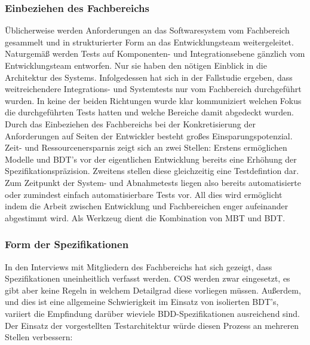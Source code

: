 \subsubsection{Einbeziehen des Fachbereichs}
Üblicherweise werden Anforderungen an das Softwaresystem vom Fachbereich gesammelt und in strukturierter Form an das Entwicklungsteam weitergeleitet. Naturgemäß werden Tests auf Komponenten- und Integrationsebene gänzlich vom Entwicklungsteam entworfen. Nur sie haben den nötigen Einblick in die Architektur des Systems. Infolgedessen hat sich in der Fallstudie ergeben, dass weitreichendere Integrations- und Systemtests nur vom Fachbereich durchgeführt wurden. In keine der beiden Richtungen wurde klar kommuniziert welchen Fokus die durchgeführten Tests hatten und welche Bereiche damit abgedeckt wurden. Durch das Einbeziehen des Fachbereichs bei der Konkretisierung der Anforderungen auf Seiten der Entwickler besteht großes Einsparungspotenzial. Zeit- und Ressourcenersparnis zeigt sich an zwei Stellen: Erstens ermöglichen Modelle und \Gls{BDT}'s vor der eigentlichen Entwicklung bereits eine Erhöhung der Spezifikationspräzision. Zweitens stellen diese gleichzeitig eine Testdefintion dar. Zum Zeitpunkt der System- und Abnahmetests liegen also bereits automatisierte oder zumindest einfach automatisierbare Tests vor. All dies wird ermöglicht indem die Arbeit zwischen Entwicklung und Fachbereichen enger aufeinander abgestimmt wird. Als Werkzeug dient die Kombination von \Gls{MBT} und \Gls{BDT}.

\subsubsection{Form der Spezifikationen}
In den Interviews mit Mitgliedern des Fachbereichs hat sich gezeigt, dass Spezifikationen uneinheitlich verfasst werden. \Gls{COS} werden zwar eingesetzt, es gibt aber keine Regeln in welchem Detailgrad diese vorliegen müssen. Außerdem, und dies ist eine allgemeine Schwierigkeit im Einsatz von isolierten \Gls{BDT}'s, variiert die Empfindung darüber wieviele \Gls{BDD}-Spezifikationen ausreichend sind.\\ Der Einsatz der vorgestellten Testarchitektur würde diesen Prozess an mehreren Stellen verbessern:

